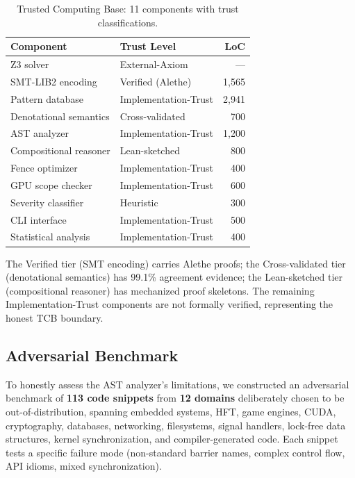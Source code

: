 \documentclass[11pt]{article}
\begin{document}
\begin{table}[ht]
\centering
\caption{Trusted Computing Base: 11 components with trust classifications.}
\label{tab:tcb}
\small
\begin{tabular}{llr}
\toprule
\textbf{Component} & \textbf{Trust Level} & \textbf{LoC} \\
\midrule
Z3 solver               & External-Axiom  & --- \\
SMT-LIB2 encoding       & Verified (Alethe) & 1{,}565 \\
Pattern database         & Implementation-Trust & 2{,}941 \\
Denotational semantics   & Cross-validated & 700 \\
AST analyzer             & Implementation-Trust & 1{,}200 \\
Compositional reasoner   & Lean-sketched & 800 \\
Fence optimizer          & Implementation-Trust & 400 \\
GPU scope checker        & Implementation-Trust & 600 \\
Severity classifier      & Heuristic & 300 \\
CLI interface            & Implementation-Trust & 500 \\
Statistical analysis     & Implementation-Trust & 400 \\
\bottomrule
\end{tabular}
\end{table}

\noindent
The Verified tier (SMT encoding) carries Alethe proofs;
the Cross-validated tier (denotational semantics) has 99.1\%
agreement evidence; the Lean-sketched tier (compositional reasoner)
has mechanized proof skeletons.  The remaining Implementation-Trust
components are not formally verified, representing the honest TCB boundary.

\subsection{Adversarial Benchmark}
\label{sec:adversarial-benchmark}

To honestly assess the AST analyzer's limitations,
we constructed an adversarial benchmark of \textbf{113 code snippets}
from \textbf{12 domains} deliberately chosen to be out-of-distribution,
spanning embedded systems, HFT, game engines, CUDA, cryptography,
databases, networking, filesystems, signal handlers, lock-free data
structures, kernel synchronization, and compiler-generated code.
Each snippet tests a specific failure mode (non-standard barrier names,
complex control flow, API idioms, mixed synchronization).
\end{document}
